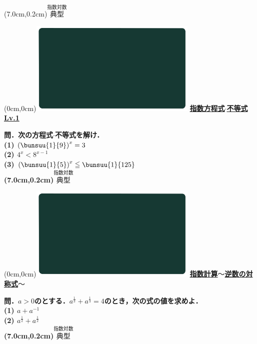 \documentclass[10pt,
fleqn,
dvipdfmx,
uplatex
]{jsarticle}
\begin{document}
\at(7.0cm,0.2cm){\small\color{bradorange}$\overset{\text{指数対数}}{\text{典型}}$}


\newpage



\at(0cm,0cm){\includegraphics[width=8cm,bb=0 0 1920 1080]{./youtube/thumbnails/templates/smart_background/指数対数.jpeg}}
{\color{orange}\bf\boldmath\Large\underline{指数方程式$\cdot$不等式 Lv.1 }}\vspace{0.3zw}

\large 
\bf\boldmath 問．次の方程式$\cdot$不等式を解け．\\
(1)  $\left(\bunsuu{1}{9}\right)^x=3$\\
(2)  $4^x<8^{x-1}$\\
(3)  $\left(\bunsuu{1}{5}\right)^x\leqq \bunsuu{1}{{{125}}}$\\

\at(7.0cm,0.2cm){\small\color{bradorange}$\overset{\text{指数対数}}{\text{典型}}$}


\newpage



\at(0cm,0cm){\includegraphics[width=8cm,bb=0 0 1920 1080]{./youtube/thumbnails/templates/smart_background/指数対数.jpeg}}
{\color{orange}\bf\boldmath\Large\underline{指数計算$〜$逆数の対称式$〜$}}\vspace{0.3zw}

\large 
\bf\boldmath 問．$a>0$のとする．$a^{\frac{1}{3}}+a^{\frac{1}{3}}=4$のとき，次の式の値を求めよ．\\
(1)  $a+a^{-1}$\\
(2)  $a^{\frac{1}{2}}+a^{\frac{1}{2}}$\\

\at(7.0cm,0.2cm){\small\color{bradorange}$\overset{\text{指数対数}}{\text{典型}}$}
\end{document}
